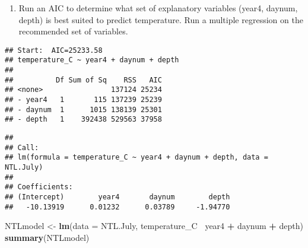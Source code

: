 \documentclass[]{article}
\newenvironment{Shaded}{\begin{snugshade}}{\end{snugshade}}
\newcommand{\CommentTok}[1]{\textcolor[rgb]{0.56,0.35,0.01}{\textit{#1}}}
\newcommand{\DataTypeTok}[1]{\textcolor[rgb]{0.13,0.29,0.53}{#1}}
\newcommand{\DecValTok}[1]{\textcolor[rgb]{0.00,0.00,0.81}{#1}}
\newcommand{\KeywordTok}[1]{\textcolor[rgb]{0.13,0.29,0.53}{\textbf{#1}}}
\newcommand{\NormalTok}[1]{#1}
\newcommand{\OperatorTok}[1]{\textcolor[rgb]{0.81,0.36,0.00}{\textbf{#1}}}
\newcommand{\StringTok}[1]{\textcolor[rgb]{0.31,0.60,0.02}{#1}}
\providecommand{\tightlist}{%
  \setlength{\itemsep}{0pt}\setlength{\parskip}{0pt}}
\begin{document}
\begin{enumerate}
\def\labelenumi{\arabic{enumi}.}
\setcounter{enumi}{3}
\tightlist
\item
  Run an AIC to determine what set of explanatory variables (year4,
  daynum, depth) is best suited to predict temperature. Run a multiple
  regression on the recommended set of variables.
\end{enumerate}

\begin{Shaded}
\end{Shaded}

\begin{verbatim}
## Start:  AIC=25233.58
## temperature_C ~ year4 + daynum + depth
## 
##          Df Sum of Sq    RSS   AIC
## <none>                137124 25234
## - year4   1       115 137239 25239
## - daynum  1      1015 138139 25301
## - depth   1    392438 529563 37958
\end{verbatim}

\begin{verbatim}
## 
## Call:
## lm(formula = temperature_C ~ year4 + daynum + depth, data = NTL.July)
## 
## Coefficients:
## (Intercept)        year4       daynum        depth  
##   -10.13919      0.01232      0.03789     -1.94770
\end{verbatim}

\begin{Shaded}
\begin{Highlighting}[]
\NormalTok{NTLmodel <-}\StringTok{ }\KeywordTok{lm}\NormalTok{(}\DataTypeTok{data =}\NormalTok{ NTL.July, temperature_C}\OperatorTok{~}\StringTok{ }\NormalTok{year4 }\OperatorTok{+}\StringTok{ }\NormalTok{daynum }\OperatorTok{+}\StringTok{ }\NormalTok{depth)}
\KeywordTok{summary}\NormalTok{(NTLmodel) }
\end{Highlighting}
\end{Shaded}
\end{document}
